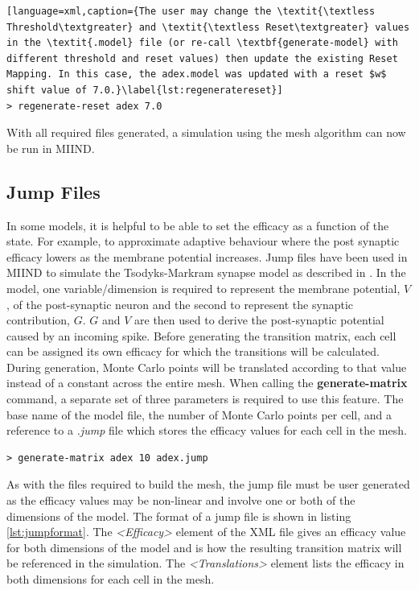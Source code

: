 \documentclass[utf8]{frontiersSCNS} %
\begin{document}
\begin{lstlisting}[language=xml,caption={The user may change the \textit{\textless Threshold\textgreater} and \textit{\textless Reset\textgreater} values in the \textit{.model} file (or re-call \textbf{generate-model} with different threshold and reset values) then update the existing Reset Mapping. In this case, the adex.model was updated with a reset $w$ shift value of 7.0.}\label{lst:regeneratereset}]
> regenerate-reset adex 7.0
\end{lstlisting}

With all required files generated, a simulation using the mesh algorithm can now be run in MIIND.

\subsection{Jump Files}
In some models, it is helpful to be able to set the efficacy as a function of the state. For example, to approximate adaptive behaviour where the post synaptic efficacy lowers as the membrane potential increases. Jump files have been used in MIIND to simulate the Tsodyks-Markram \citep{tsodyks1997neural} synapse model as described in \cite{de2019computational}. In the model, one variable/dimension is required to represent the membrane potential, $V$, of the post-synaptic neuron and the second to represent the synaptic contribution, $G$. $G$ and $V$ are then used to derive the post-synaptic potential caused by an incoming spike. Before generating the transition matrix, each cell can be assigned its own efficacy for which the transitions will be calculated. During generation, Monte Carlo points will be translated according to that value instead of a constant across the entire mesh. When calling the \textbf{generate-matrix} command, a separate set of three parameters is required to use this feature. The base name of the model file, the number of Monte Carlo points per cell, and a reference to a \textit{.jump} file which stores the efficacy values for each cell in the mesh. 

\begin{lstlisting}[language=xml,caption={Generate a transition matrix with a jump file in the CLI}]
> generate-matrix adex 10 adex.jump
\end{lstlisting}

As with the files required to build the mesh, the jump file must be user generated as the efficacy values may be non-linear and involve one or both of the dimensions of the model. The format of a jump file is shown in listing \ref{lst:jumpformat}. The \textit{\textless Efficacy\textgreater} element of the XML file gives an efficacy value for both dimensions of the model and is how the resulting transition matrix will be referenced in the simulation. The \textit{\textless Translations\textgreater} element lists the efficacy in both dimensions for each cell in the mesh.
\end{document}
